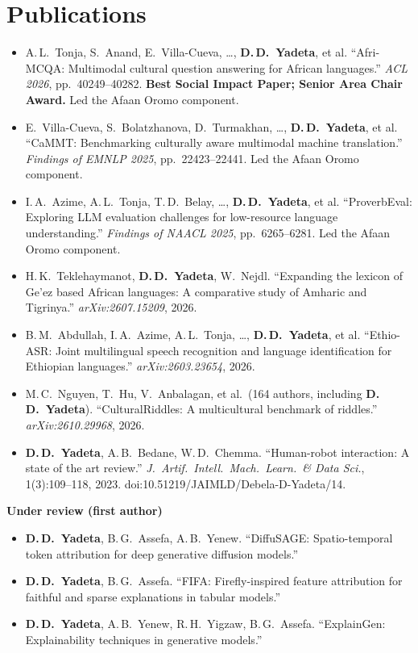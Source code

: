\documentclass[10pt,a4paper]{article}
\newcommand{\me}{\textbf{D.\,D.~Yadeta}}
\begin{document}
\section{Publications}
\begin{itemize}
  \item A.\,L.~Tonja, S.~Anand, E.~Villa-Cueva, \ldots, \me, et al. ``Afri-MCQA: Multimodal cultural question answering for African languages.'' \textit{ACL 2026}, pp.~40249--40282. \textbf{Best Social Impact Paper; Senior Area Chair Award.} Led the Afaan Oromo component.
  \item E.~Villa-Cueva, S.~Bolatzhanova, D.~Turmakhan, \ldots, \me, et al. ``CaMMT: Benchmarking culturally aware multimodal machine translation.'' \textit{Findings of EMNLP 2025}, pp.~22423--22441. Led the Afaan Oromo component.
  \item I.\,A.~Azime, A.\,L.~Tonja, T.\,D.~Belay, \ldots, \me, et al. ``ProverbEval: Exploring LLM evaluation challenges for low-resource language understanding.'' \textit{Findings of NAACL 2025}, pp.~6265--6281. Led the Afaan Oromo component.
  \item H.\,K.~Teklehaymanot, \me, W.~Nejdl. ``Expanding the lexicon of Ge'ez based African languages: A comparative study of Amharic and Tigrinya.'' \textit{arXiv:2607.15209}, 2026.
  \item B.\,M.~Abdullah, I.\,A.~Azime, A.\,L.~Tonja, \ldots, \me, et al. ``Ethio-ASR: Joint multilingual speech recognition and language identification for Ethiopian languages.'' \textit{arXiv:2603.23654}, 2026.
  \item M.\,C.~Nguyen, T.~Hu, V.~Anbalagan, et al.\ (164 authors, including \me). ``CulturalRiddles: A multicultural benchmark of riddles.'' \textit{arXiv:2610.29968}, 2026.
  \item \me, A.\,B.~Bedane, W.\,D.~Chemma. ``Human-robot interaction: A state of the art review.'' \textit{J.\ Artif.\ Intell.\ Mach.\ Learn.\ \& Data Sci.}, 1(3):109--118, 2023. doi:10.51219/JAIMLD/Debela-D-Yadeta/14.
\end{itemize}
\textbf{Under review (first author)}
\begin{itemize}
  \item \me, B.\,G.~Assefa, A.\,B.~Yenew. ``DiffuSAGE: Spatio-temporal token attribution for deep generative diffusion models.''
  \item \me, B.\,G.~Assefa. ``FIFA: Firefly-inspired feature attribution for faithful and sparse explanations in tabular models.''
  \item \me, A.\,B.~Yenew, R.\,H.~Yigzaw, B.\,G.~Assefa. ``ExplainGen: Explainability techniques in generative models.''
\end{itemize}
\end{document}

